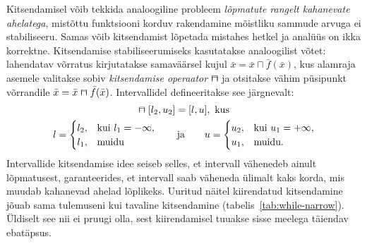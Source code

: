\documentclass[../thesis.tex]{subfiles}
\begin{document}
Kitsendamisel võib tekkida analoogiline probleem \emph{lõpmatute rangelt kahanevate ahelatega}, mistõttu funktsiooni korduv rakendamine mõistliku sammude arvuga ei stabiliseeru. Samas võib kitsendamist lõpetada mistahes hetkel ja analüüs on ikka korrektne. Kitsendamise stabiliseerumiseks kasutatakse analoogilist võtet: lahendatav võrratus kirjutatakse samaväärsel kujul $\bar{x} = \bar{x} \sqcap \bar{f}(\bar{x})$, kus alamraja asemele valitakse sobiv \emph{kitsendamise operaator} $\narrow$ ja otsitakse vähim püsipunkt võrrandile $\bar{x} = \bar{x} \narrow \bar{f}(\bar{x})$. Intervallidel defineeritakse see järgnevalt:
\begin{gather*}
	[l_1, u_1] \narrow [l_2, u_2] = [l, u], \text{ kus} \\
	l = \begin{cases}
		l_2, & \text{kui } l_1 = -\infty, \\
		l_1, & \text{muidu}
	\end{cases}
	\qquad \text{ja} \qquad
	u = \begin{cases}
		u_2, & \text{kui } u_1 = +\infty, \\
		u_1, & \text{muidu}.
	\end{cases}
\end{gather*}
Intervallide kitsendamise idee seiseb selles, et intervall vähenedeb ainult lõpmatusest, garanteerides, et intervall saab väheneda ülimalt kaks korda, mis muudab kahanevad ahelad lõplikeks. Uuritud näitel kiirendatud kitsendamine jõuab sama tulemuseni kui tavaline kitsendamine (tabelis~\ref{tab:while-narrow}). Üldiselt see nii ei pruugi olla, sest kiirendamisel tuuakse sisse meelega täiendav ebatäpsus.
\end{document}
